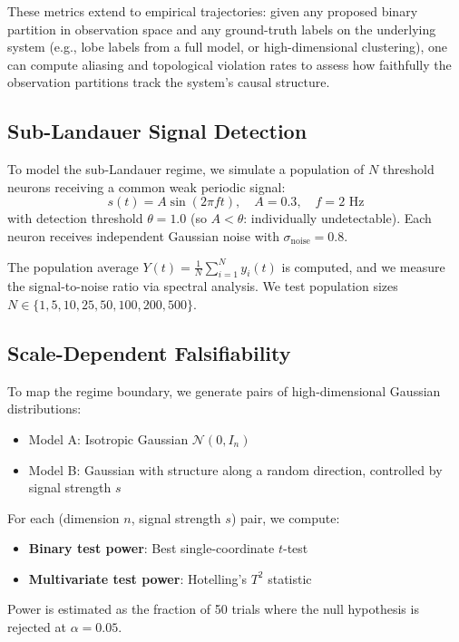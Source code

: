 \documentclass[12pt]{article}
\begin{document}
These metrics extend to empirical trajectories: given any proposed binary partition in observation space and any ground-truth labels on the underlying system (e.g., lobe labels from a full model, or high-dimensional clustering), one can compute aliasing and topological violation rates to assess how faithfully the observation partitions track the system's causal structure.

\subsection{Sub-Landauer Signal Detection}

To model the sub-Landauer regime, we simulate a population of $N$ threshold neurons receiving a common weak periodic signal:
\begin{equation}
s(t) = A \sin(2\pi f t), \quad A = 0.3, \quad f = 2 \text{ Hz}
\end{equation}
with detection threshold $\theta = 1.0$ (so $A < \theta$: individually undetectable). Each neuron receives independent Gaussian noise with $\sigma_{\text{noise}} = 0.8$.

The population average $Y(t) = \frac{1}{N}\sum_{i=1}^N y_i(t)$ is computed, and we measure the signal-to-noise ratio via spectral analysis. We test population sizes $N \in \{1, 5, 10, 25, 50, 100, 200, 500\}$.

\subsection{Scale-Dependent Falsifiability}

To map the regime boundary, we generate pairs of high-dimensional Gaussian distributions:
\begin{itemize}
    \item Model A: Isotropic Gaussian $\mathcal{N}(0, I_n)$
    \item Model B: Gaussian with structure along a random direction, controlled by signal strength $s$
\end{itemize}

For each (dimension $n$, signal strength $s$) pair, we compute:
\begin{itemize}
    \item \textbf{Binary test power}: Best single-coordinate $t$-test
    \item \textbf{Multivariate test power}: Hotelling's $T^2$ statistic
\end{itemize}
Power is estimated as the fraction of 50 trials where the null hypothesis is rejected at $\alpha = 0.05$.
\end{document}
